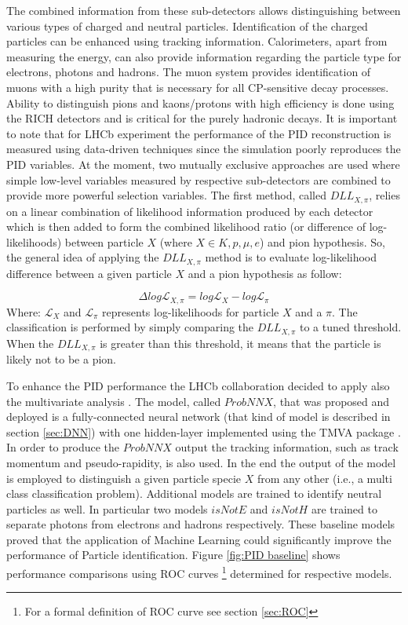 The combined information from these sub-detectors allows distinguishing between various types of charged and neutral particles. Identification of the charged particles can be enhanced using tracking information. Calorimeters, apart from measuring the energy, can also provide information regarding the particle type for electrons, photons and hadrons. The muon system provides identification of muons with a high purity that is necessary for all CP-sensitive decay processes. Ability to distinguish pions and kaons/protons with high efficiency is done using the RICH detectors and is critical for the purely hadronic decays. It is important to note that for LHCb experiment the performance of the PID reconstruction is measured using data-driven techniques since the simulation poorly reproduces the PID variables. At the moment, two mutually exclusive approaches are used where simple low-level variables measured by respective sub-detectors are combined to provide more powerful selection variables. The first method, called $DLL_{X,\pi}$, relies on a linear combination of likelihood information produced by each detector which is then added to form the combined likelihood ratio (or difference of log-likelihoods) between particle $X$ (where $X \in {K, p, \mu, e}$) and pion hypothesis. So, the general idea of applying the $DLL_{X,\pi}$ method is to evaluate log-likelihood difference between a given particle $X$ and a pion hypothesis as follow:

\begin{equation}
\Delta log \mathcal{L}_{X,\pi} = log \mathcal{L}_{X} - log \mathcal{L}_{\pi}  
\end{equation}
Where: $ \mathcal{L}_{X}$ and $ \mathcal{L}_{\pi}$ represents log-likelihoods for particle $X$ and a $\pi$. The classification is performed by simply comparing the $DLL_{X,\pi}$ to a tuned threshold. When the $DLL_{X,\pi}$ is greater than this threshold, it means that the particle is likely not to be a pion. 


To enhance the PID performance the LHCb collaboration decided to apply also the multivariate analysis \cite{PID}. The model, called $ProbNNX$, that was proposed and deployed is a fully-connected neural network (that kind of model is described in section \ref{sec:DNN}) with one hidden-layer implemented using the TMVA package \cite{TMVA}. In order to produce the $ProbNNX$ output the tracking information, such as track momentum and pseudo-rapidity, is also used. In the end the output of the model is employed to distinguish a given particle specie $X$ from any other (i.e., a multi class classification problem). Additional models are trained to identify neutral particles as well. In particular two models $isNotE$ and $isNotH$ are trained to separate photons from electrons and hadrons respectively.
These baseline models proved that the application of Machine Learning could significantly improve the performance of Particle identification. Figure \ref{fig:PID baseline} shows performance comparisons using ROC curves \footnote{For a formal definition of ROC curve see section \ref{sec:ROC}} determined for respective models.


